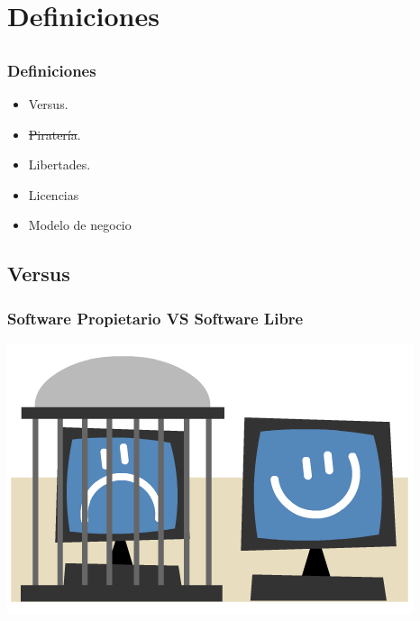 %
%

\section{Definiciones}

\subsection{}
\begin{frame}
    \frametitle{Definiciones}
        \begin{itemize}
            \item Versus.\par
            \indent\par
            \item \sout{Piratería}.\par
            \indent\par
            \item Libertades.\par
            \indent\par
            \item Licencias\par
            \indent\par
            \item Modelo de negocio\par
            \indent\par
        \end{itemize}
\end{frame}

\subsection{Versus}
\begin{frame}
    \frametitle{Software Propietario VS Software Libre}
    \includegraphics[width=\textwidth]{LibreVSPropietario.png}
\end{frame}

